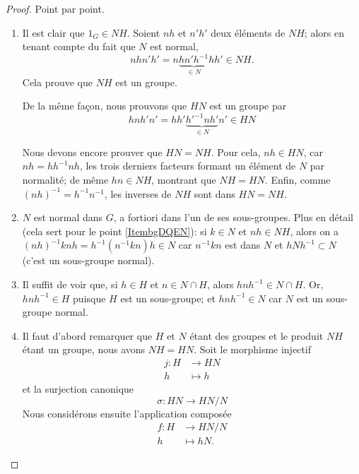\begin{proof}
    Point par point.
    \begin{enumerate}
        \item
            Il est clair que \( 1_G \in NH \). Soient $nh$ et $n'h'$ deux éléments de \( NH \); alors en tenant compte du fait que \( N\) est normal,
            \begin{equation}
                nhn'h'=n\underbrace{hn'h^{-1}}_{\in N}hh'\in NH.
            \end{equation}
            Cela prouve que \( NH\) est un groupe.

            De la même façon, nous prouvons que \( HN\) est un groupe par
            \begin{equation}
                hnh'n'=hh'\underbrace{h'^{-1}nh'}_{\in N}n'\in HN
            \end{equation}

            Nous devons encore prouver que \( HN=NH\). Pour cela, \( nh \in HN \), car \( nh = hh^{-1}nh \), les trois derniers facteurs formant un  élément de \( N \) par normalité; de même \( hn \in NH \), montrant que \( NH = HN \). Enfin, comme \( (nh)^{-1} = h^{-1} n^{-1} \), les inverses de \( NH \) sont dans \( HN = NH \).
        \item
            \( N\) est normal dans \( G \), a fortiori dans l'un de ses sous-groupes. Plus en détail (cela sert pour le point \ref{ItembgDQEN}): si \( k \in N \) et \( nh \in NH \), alors on a \( (nh)^{-1}knh = h^{-1} (n^{-1}kn) h \in N \) car \(n^{-1}kn\) est dans \( N \) et  \( hNh^{-1}\subset N\) (c'est un sous-groupe normal).
        \item
            Il suffit de voir que, si \( h \in H \) et \( n \in N \cap H \), alors \( hnh^{-1} \in N \cap H \). Or, \( hnh^{-1} \in H \) puisque \( H\) est un sous-groupe; et \( hnh^{-1} \in N \) car \( N \) est un sous-groupe normal.
        \item
            Il faut d'abord remarquer que \( H\) et \( N\) étant des groupes et le produit \( NH\) étant un groupe, nous avons \( NH=HN\). Soit le morphisme injectif
            \begin{equation}
                \begin{aligned}
                    j\colon H&\to HN \\
                    h&\mapsto h
                \end{aligned}
            \end{equation}
            et la surjection canonique
            \begin{equation}
                \sigma\colon HN\to HN/N
            \end{equation}
            Nous considérons ensuite l'application composée
            \begin{equation}
                \begin{aligned}
                    f\colon H&\to HN/N \\
                    h&\mapsto hN.
                \end{aligned}
            \end{equation}


\end{enumerate}
\end{proof}
